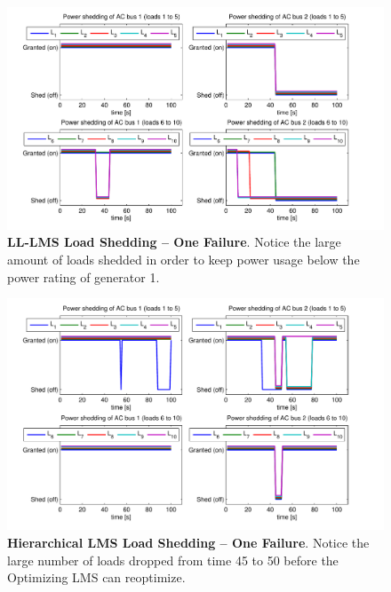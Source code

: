 \documentclass{acm_proc_article-sp}
\begin{document}
\begin{figure}[htb]
  \centering
  \includegraphics[width=0.9\columnwidth]{figures/lsllonefail}
  \caption{\textbf{LL-LMS Load Shedding -- One Failure}. Notice
  the large amount of loads shedded in order to keep power usage below the power rating
  of generator 1.}
  \label{fig:lsllonefail}
\end{figure}
\begin{figure}[htb]
  \centering
  \includegraphics[width=0.9\columnwidth]{figures/lsolonefail}
  \caption{\textbf{Hierarchical LMS Load Shedding -- One Failure}. Notice the
  large number of loads dropped from time 45 to 50 before the Optimizing LMS can reoptimize.}
  \label{fig:lsolonefail}
\end{figure}
\end{document}
